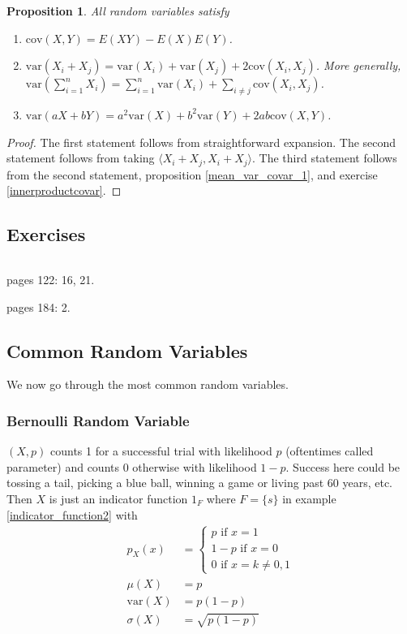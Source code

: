 \documentclass[12pt]{amsart}
\newtheorem{proposition}[theorem]{Proposition}
\theoremstyle{definition}
\begin{document}
\begin{proposition} \label{mean_var_covar_2} All random variables satisfy
\begin{enumerate}[1.]
\item $\text{cov}(X, Y) = E(XY) - E(X)E(Y)$.
\item $\text{var}(X_i + X_j) = \text{var}(X_i) + \text{var}(X_j) + 2\text{cov}(X_i, X_j)$. More generally,\\
$\text{var}(\sum\limits_{i=1}^n X_i) = \sum\limits_{i=1}^n \text{var}(X_i) + \sum\limits_{i \neq j}\text{cov}(X_i, X_j)$.
\item $\text{var}(aX + bY) = a^2 \text{var}(X) + b^2 \text{var}(Y) + 2ab \text{cov}(X, Y)$.
\end{enumerate}
\end{proposition}
\begin{proof} The first statement follows from straightforward expansion. The second statement follows from taking $\langle X_i + X_j, X_i + X_j \rangle$. The third statement follows from the second statement, proposition \ref{mean_var_covar_1}, and exercise \ref{innerproductcovar}.
\end{proof}

\subsection{Exercises} $ $

pages 122: 16, 21.

pages 184: 2.

\subsection{Common Random Variables} \label{randomvariables} We now go through the most common random variables.

\subsubsection{Bernoulli Random Variable} $(X, p)$ counts 1 for a successful trial with likelihood $p$ (oftentimes called parameter) and counts 0 otherwise with likelihood $1 - p$. Success here could be tossing a tail, picking a blue ball, winning a game or living past 60 years, etc. Then $X$ is just an indicator function $1_F$ where $F = \{s\}$ in example \ref{indicator_function2} with
\begin{align*}
p_X(x) & = \begin{cases} p \text{ if } x = 1 \\ 1 - p \text{ if } x = 0 \\ 0 \text{ if } x = k \neq 0, 1 \end{cases} \\
\mu(X) & = p \\
\text{var}(X) & = p(1 - p) \\
\sigma(X) & = \sqrt{p(1 - p)}
\end{align*}
\end{document}
